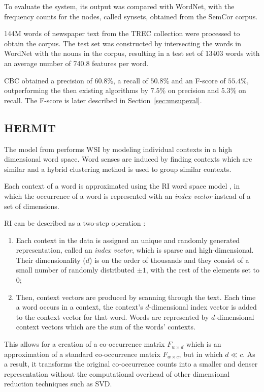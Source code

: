 To evaluate the system, its output was compared with WordNet, with the
frequency counts for the nodes, called synsets, obtained from the SemCor corpus.

144M words of newspaper text from the TREC collection were processed to obtain
the corpus. The test set was constructed by intersecting the words in
WordNet with the nouns in the corpus, resulting in a test set of 13403 words
with an average number of 740.8 features per word.

\ac{CBC} obtained a precision of $60.8\%$, a recall of $50.8\%$ and an
F-score of $55.4\%$, outperforming the then existing algorithms by $7.5\%$ on
precision and $5.3\%$ on recall. The F-score is later described in
Section~\ref{sec:unsupeval}.

\subsection{HERMIT}

The model from \cite{jurgens2010hermit} performs \ac{WSI} by modeling individual
contexts in a high dimensional word space. Word senses are induced by finding
contexts which are similar and a hybrid clustering method is used to group
similar contexts.

Each context of a word is approximated using the \ac{RI} word space model
\cite{kanerva2000random}, in which the occurrence of a word is represented with
an \textit{index vector} instead of a set of dimensions.

\ac{RI} can be described as a two-step operation
\cite{sahlgren2005introduction}:

\begin{enumerate}
 \item Each context in the data is assigned an unique and randomly generated
 representation, called an \textit{index vector}, which is sparse and
 high-dimensional. Their dimensionality ($d$) is on the order of thousands and
 they consist of a small number of randomly distributed $\pm1$, with the rest
 of the elements set to $0$;
 \item Then, context vectors are produced by scanning through the text. Each
 time a word occurs in a context, the context's $d$-dimensional index vector is
 added to the context vector for that word. Words are represented by
 $d$-dimensional context vectors which are the sum of the words' contexts.
\end{enumerate}

This allows for a creation of a co-occurrence matrix $F_{w \times d}$ which is
an approximation of a standard co-occurrence matrix $F_{w \times c}$, but in
which $d \ll c$. As a result, it transforms the original co-occurrence counts
into a smaller and denser representation without the computational overhead of
other dimensional reduction techniques such as \ac{SVD}.

